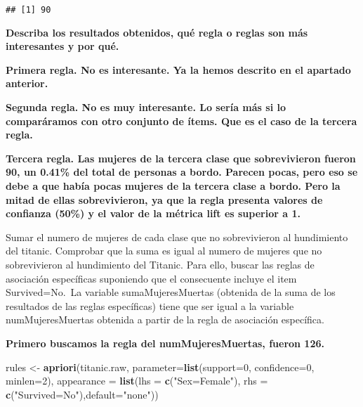 \documentclass[]{article}
\newenvironment{Shaded}{\begin{snugshade}}{\end{snugshade}}
\newcommand{\DataTypeTok}[1]{\textcolor[rgb]{0.13,0.29,0.53}{#1}}
\newcommand{\DecValTok}[1]{\textcolor[rgb]{0.00,0.00,0.81}{#1}}
\newcommand{\KeywordTok}[1]{\textcolor[rgb]{0.13,0.29,0.53}{\textbf{#1}}}
\newcommand{\NormalTok}[1]{#1}
\newcommand{\OperatorTok}[1]{\textcolor[rgb]{0.81,0.36,0.00}{\textbf{#1}}}
\newcommand{\StringTok}[1]{\textcolor[rgb]{0.31,0.60,0.02}{#1}}
\begin{document}
\begin{Shaded}
\end{Shaded}

\begin{verbatim}
## [1] 90
\end{verbatim}

\textbf{Describa los resultados obtenidos, qué regla o reglas son más
interesantes y por qué.}

\textbf{Primera regla. No es interesante. Ya la hemos descrito en el
apartado anterior.}

\textbf{Segunda regla. No es muy interesante. Lo sería más si lo
comparáramos con otro conjunto de ítems. Que es el caso de la tercera
regla.}

\textbf{Tercera regla. Las mujeres de la tercera clase que sobrevivieron
fueron 90, un 0.41\% del total de personas a bordo. Parecen pocas, pero
eso se debe a que había pocas mujeres de la tercera clase a bordo. Pero
la mitad de ellas sobrevivieron, ya que la regla presenta valores de
confianza (50\%) y el valor de la métrica lift es superior a 1.}

Sumar el numero de mujeres de cada clase que no sobrevivieron al
hundimiento del titanic. Comprobar que la suma es igual al numero de
mujeres que no sobrevivieron al hundimiento del Titanic. Para ello,
buscar las reglas de asociación específicas suponiendo que el
consecuente incluye el item Survived=No.~La variable sumaMujeresMuertas
(obtenida de la suma de los resultados de las reglas específicas) tiene
que ser igual a la variable numMujeresMuertas obtenida a partir de la
regla de asociación específica.

\textbf{Primero buscamos la regla del numMujeresMuertas, fueron 126.}

\begin{Shaded}
\begin{Highlighting}[]
\NormalTok{rules <-}\StringTok{ }\KeywordTok{apriori}\NormalTok{(titanic.raw, }\DataTypeTok{parameter=}\KeywordTok{list}\NormalTok{(}\DataTypeTok{support=}\DecValTok{0}\NormalTok{, }\DataTypeTok{confidence=}\DecValTok{0}\NormalTok{, }\DataTypeTok{minlen=}\DecValTok{2}\NormalTok{), }
                 \DataTypeTok{appearance =} \KeywordTok{list}\NormalTok{(}\DataTypeTok{lhs =} \KeywordTok{c}\NormalTok{(}\StringTok{"Sex=Female"}\NormalTok{), }\DataTypeTok{rhs =} \KeywordTok{c}\NormalTok{(}\StringTok{"Survived=No"}\NormalTok{),}\DataTypeTok{default=}\StringTok{"none"}\NormalTok{))}
\end{Highlighting}
\end{Shaded}
\end{document}
